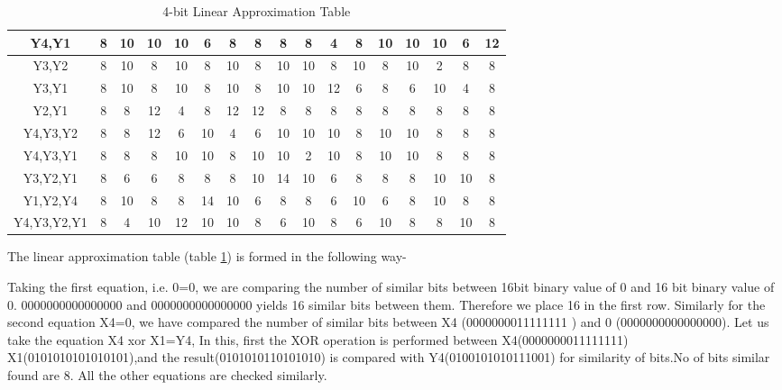 \documentclass[12pt]{article}
\begin{document}
\begin{table}[H]
\begin{adjustbox}{width=\textwidth}
\begin{tabular}{|c|c|c|c|c|c|c|c|c|c|c|c|c|c|c|c|c|}
        \hline
        Y4,Y1       & 8  & 10 & 10 & 10 & 6  & 8     & 8     & 8     & 8     & 4     & 8     & 10       & 10       & 10       & 6        & 12          \\
        \hline
        Y3,Y2       & 8  & 10 & 8  & 10 & 8  & 10    & 8     & 10    & 10    & 8     & 10    & 8        & 10       & 2        & 8        & 8           \\
        \hline
        Y3,Y1       & 8  & 10 & 8  & 10 & 8  & 10    & 8     & 10    & 10    & 12    & 6     & 8        & 6        & 10       & 4        & 8           \\
        \hline
        Y2,Y1       & 8  & 8  & 12 & 4  & 8  & 12    & 12    & 8     & 8     & 8     & 8     & 8        & 8        & 8        & 8        & 8           \\
        \hline
        Y4,Y3,Y2    & 8  & 8  & 12 & 6  & 10 & 4     & 6     & 10    & 10    & 10    & 8     & 10       & 10       & 8        & 8        & 8           \\
        \hline
        Y4,Y3,Y1    & 8  & 8  & 8  & 10 & 10 & 8     & 10    & 10    & 2     & 10    & 8     & 10       & 10       & 8        & 8        & 8           \\
        \hline
        Y3,Y2,Y1    & 8  & 6  & 6  & 8  & 8  & 8     & 10    & 14    & 10    & 6     & 8     & 8        & 8        & 10       & 10       & 8           \\
        \hline
        Y1,Y2,Y4    & 8  & 10 & 8  & 8  & 14 & 10    & 6     & 8     & 8     & 6     & 10    & 6        & 8        & 10       & 8        & 8           \\
        \hline
        Y4,Y3,Y2,Y1 & 8  & 4  & 10 & 12 & 10 & 10    & 8     & 6     & 10    & 8     & 6     & 10       & 8        & 8        & 10       & 8           \\
        \hline
    \end{tabular}
    \end{adjustbox}
    \caption{4-bit Linear Approximation Table}
    \label{table:9}
\end{table}
The linear approximation table (table \ref{table:9}) is formed in the following way- 

Taking the first equation, i.e. 0=0, we are comparing the number of similar bits between 16bit binary value of 0 and 16 bit binary value of 0. 0000000000000000 and 0000000000000000 yields 16 similar bits between them. Therefore we place 16 in the first row. Similarly for the second equation X4=0, we have compared the number of similar bits between X4 (0000000011111111 ) and 0 (0000000000000000). Let us take the equation X4 xor X1=Y4, In this, first the XOR operation is performed between X4(0000000011111111) X1(0101010101010101),and the result(0101010110101010) is compared with Y4(0100101010111001) for similarity of bits.No of bits similar found are 8. All the other equations are checked similarly.
\end{document}
